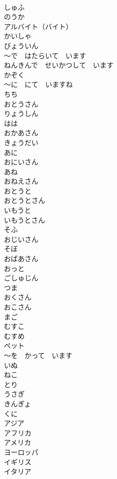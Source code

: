 \documentclass[8pt]{extreport}
\begin{document}
\begin{CJK}{UTF8}{min}
\\	しゅふ	
\\	のうか	
\\	アルバイト（バイト）	
\\	かいしゃ	
\\	びょういん	
\\	～で　はたらいて　います	
\\	ねんきんで　せいかつして　います	
\\	かぞく	
\\	～に　にて　いますね	
\\	ちち	
\\	おとうさん	
\\	りょうしん	
\\	はは	
\\	おかあさん	
\\	きょうだい	
\\	あに	
\\	おにいさん	
\\	あね	
\\	おねえさん	
\\	おとうと	
\\	おとうとさん	
\\	いもうと	
\\	いもうとさん	
\\	そふ	
\\	おじいさん	
\\	そぼ	
\\	おばあさん	
\\	おっと	
\\	ごしゅじん	
\\	つま	
\\	おくさん	
\\	おこさん	
\\	まご	
\\	むすこ	
\\	むすめ	
\\	ペット	
\\	～を　かって　います	
\\	いぬ	
\\	ねこ	
\\	とり	
\\	うさぎ	
\\	きんぎょ	
\\	くに	
\\	アジア	
\\	アフリカ	
\\	アメリカ	
\\	ヨーロッパ	
\\	イギリス	
\\	イタリア	

\end{CJK}
\end{document}
